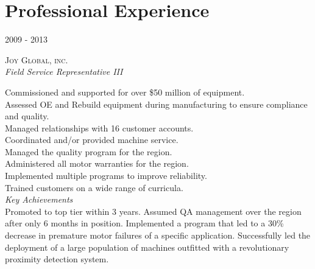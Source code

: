 \documentclass[10pt]{article} %
\begin{document}
\begin{minipage}[t]{0.5\textwidth} %
\vspace{0pt} %
	

\section{Professional Experience} 


{\raggedleft\textsc{2009 - 2013}\par}

{\raggedright\large\textsc{Joy Global, inc.}\\
\textit{Field Service Representative III}\\[5pt]}

\normalsize{\textbullet Commissioned and supported for over \$50 million of equipment. \\
\textbullet Assessed OE and Rebuild equipment during manufacturing to ensure compliance and quality. \\
\textbullet Managed relationships with 16 customer accounts. \\
\textbullet Coordinated and/or provided machine service. \\
\textbullet Managed the quality program for the region. \\
\textbullet Administered all motor warranties for the region.\\ 
\textbullet Implemented multiple programs to improve reliability.\\ 
\textbullet Trained customers on a wide range of curricula.}\\

\textit{\color{headings}Key Achievements}\\
\normalsize{Promoted to top tier within 3 years. Assumed QA management over the region after only 6 months in position. Implemented a program that led to a 30\% decrease in premature motor failures of a specific application. Successfully led the deployment of a large population of machines outfitted with a revolutionary proximity detection system.}


\end{minipage}
\end{document}
